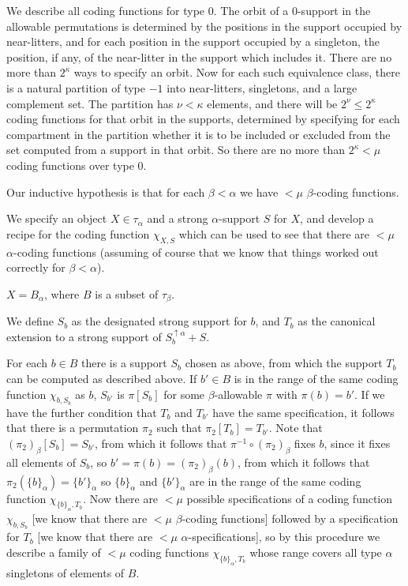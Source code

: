 \documentclass[112pt]{article}
\begin{document}
\begin{description}

\item[Analysis of coding functions for type 0:]  We describe all coding functions for type 0.  The orbit of a 0-support in the allowable permutations is determined by the positions in the support  occupied by near-litters, and for each position in the support occupied by a singleton, the position, if any, of the near-litter in the support  which includes it.  There are no more than $2^\kappa$ ways to specify an orbit.  Now for each such equivalence class, there is a natural partition of type $-1$ into near-litters, singletons, and a large complement set.  The partition has $\nu<\kappa$ elements, and there will be $2^\nu\leq 2^\kappa$ coding functions for that orbit in the supports, determined by specifying for each compartment in the partition whether it is to be included or excluded from the set computed from a support in that orbit.  So there are no more than $2^\kappa<\mu$ coding functions over type 0.

\item[Analysis of the general case:]  

\item
Our inductive hypothesis is that for each $\beta<\alpha$ we have $<\mu$ $\beta$-coding functions.



We specify an object $X\in \tau_\alpha$ and a strong $\alpha$-support $S$ for $X$, and develop a recipe for the coding function $\chi_{X,S}$ which can be used to see that there are $<\mu$ $\alpha$-coding functions (assuming of course that we know that things worked out correctly for $\beta<\alpha$).

$X = B_\alpha$, where $B$ is a subset of $\tau_\beta$.  

We define $S_b$ as the designated strong support for $b$, and $T_b$ as the canonical extension to a strong support of $S_b^{\uparrow \alpha}+S$.



For each $b \in B$ there is a support $S_b$ chosen as above, from which the support $T_b$ can be computed as described above.  If $b' \in B$ is in the range of the same coding function $\chi_{b,S_b}$ as $b$, $S_{b'}$ is $\pi[S_{b}]$ for some $\beta$-allowable $\pi$ with $\pi(b) = b'$.
If we have the further condition that $T_b$ and $T_{b'}$ have the same specification, it follows that there is a permutation $\pi_2$ such that $\pi_2[T_b] = T_{b'}$.  Note that $(\pi_2)_\beta[S_b]=S_{b'}$, from which it follows that $\pi^{-1} \circ (\pi_2)_\beta$ fixes $b$, since it fixes all elements of $S_b$, so $b'=\pi(b) = (\pi_2)_\beta(b)$, from which it follows
that $\pi_2(\{b\}_\alpha) = \{b'\}_\alpha$ so $\{b\}_\alpha$ and $\{b'\}_\alpha$ are in the range of the same coding function $\chi_{\{b\}_\alpha,T_b}$.  Now there are $<\mu$ possible specifications of a coding function $\chi_{b,S_b}$ [we know that there are $<\mu$ $\beta$-coding functions]  followed by a specification for $T_b$ [we know that there are $<\mu$ $\alpha$-specifications], so by this procedure we describe a family of $<\mu$ coding functions $\chi_{\{b\}_\alpha,T_b}$ whose range covers all type $\alpha$ singletons of elements of $B$.



\end{description}
\end{document}
